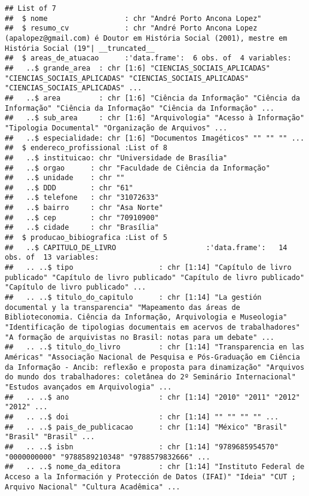 \documentclass[]{article}
\begin{document}
\begin{verbatim}
## List of 7
##  $ nome                  : chr "André Porto Ancona Lopez"
##  $ resumo_cv             : chr "André Porto Ancona Lopez (apalopez@gmail.com) é Doutor em História Social (2001), mestre em História Social (19"| __truncated__
##  $ areas_de_atuacao      :'data.frame':  6 obs. of  4 variables:
##   ..$ grande_area  : chr [1:6] "CIENCIAS_SOCIAIS_APLICADAS" "CIENCIAS_SOCIAIS_APLICADAS" "CIENCIAS_SOCIAIS_APLICADAS" "CIENCIAS_SOCIAIS_APLICADAS" ...
##   ..$ area         : chr [1:6] "Ciência da Informação" "Ciência da Informação" "Ciência da Informação" "Ciência da Informação" ...
##   ..$ sub_area     : chr [1:6] "Arquivologia" "Acesso à Informação" "Tipologia Documental" "Organização de Arquivos" ...
##   ..$ especialidade: chr [1:6] "Documentos Imagéticos" "" "" "" ...
##  $ endereco_profissional :List of 8
##   ..$ instituicao: chr "Universidade de Brasília"
##   ..$ orgao      : chr "Faculdade de Ciência da Informação"
##   ..$ unidade    : chr ""
##   ..$ DDD        : chr "61"
##   ..$ telefone   : chr "31072633"
##   ..$ bairro     : chr "Asa Norte"
##   ..$ cep        : chr "70910900"
##   ..$ cidade     : chr "Brasília"
##  $ producao_bibiografica :List of 5
##   ..$ CAPITULO_DE_LIVRO                     :'data.frame':   14 obs. of  13 variables:
##   .. ..$ tipo                    : chr [1:14] "Capítulo de livro publicado" "Capítulo de livro publicado" "Capítulo de livro publicado" "Capítulo de livro publicado" ...
##   .. ..$ titulo_do_capitulo      : chr [1:14] "La gestión documental y la transparencia" "Mapeamento das áreas de Biblioteconomia. Ciência da Informação, Arquivologia e Museologia" "Identificação de tipologias documentais em acervos de trabalhadores" "A formação de arquivistas no Brasil: notas para um debate" ...
##   .. ..$ titulo_do_livro         : chr [1:14] "Transparencia en las Américas" "Associação Nacional de Pesquisa e Pós-Graduação em Ciência da Informação - Ancib: reflexão e proposta para dinamização" "Arquivos do mundo dos trabalhadores: coletânea do 2º Seminário Internacional" "Estudos avançados em Arquivologia" ...
##   .. ..$ ano                     : chr [1:14] "2010" "2011" "2012" "2012" ...
##   .. ..$ doi                     : chr [1:14] "" "" "" "" ...
##   .. ..$ pais_de_publicacao      : chr [1:14] "México" "Brasil" "Brasil" "Brasil" ...
##   .. ..$ isbn                    : chr [1:14] "9789685954570" "0000000000" "9788589210348" "9788579832666" ...
##   .. ..$ nome_da_editora         : chr [1:14] "Instituto Federal de Acceso a la Información y Protección de Datos (IFAI)" "Ideia" "CUT ; Arquivo Nacional" "Cultura Acadêmica" ...

\end{verbatim}
\end{document}
